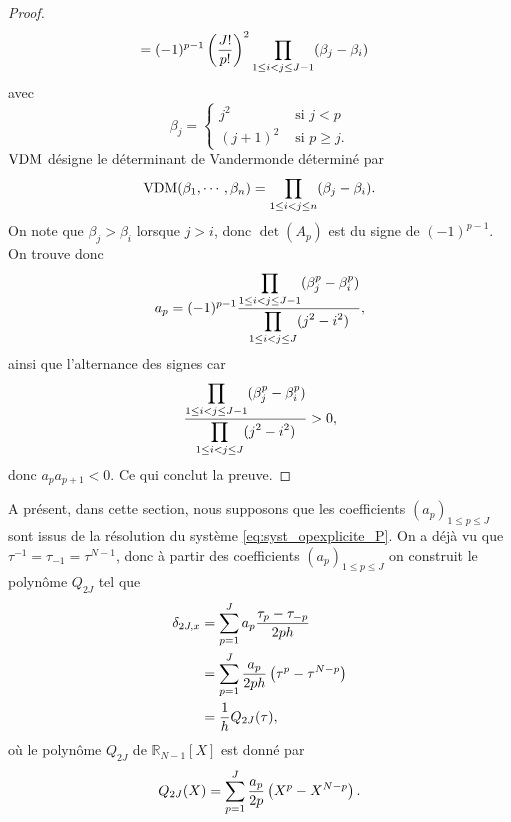 \begin{proof}
\begin{align*}
	& = (-1)^{p-1} \left( \dfrac{J!}{p!} \right)^2 \displaystyle\prod\limits_{1 \leq i <j \leq J-1}(\beta_j - \beta_i)
\end{align*}
avec
\begin{equation}
\beta_j = \left\lbrace
\begin{array}{cl}
j^2 & \text{ si } j < p \\
(j+1)^2 & \text{ si } p \geq j.
\end{array}
\right.
\end{equation}
$\text{VDM}$ désigne le déterminant de Vandermonde \cite{Evans1976} déterminé par 
\begin{equation}
\text{VDM}(\beta_1, \cdots, \beta_n) = \displaystyle\prod\limits_{1\leq i < j \leq n} (\beta_j - \beta_i).
\end{equation}
On note que $\beta_j > \beta_i$ lorsque $j>i$, donc $\det (A_p)$ est du signe de $(-1)^{p-1}$.
On trouve donc 
\begin{equation}
a_p = (-1)^{p-1} \dfrac{\displaystyle\prod\limits_{1 \leq i <j \leq J-1}(\beta_j^p - \beta_i^p)}{\displaystyle\prod\limits_{1 \leq i <j \leq J}(j^2 - i^2)},
\end{equation}
ainsi que l'alternance des signes car
\begin{equation}
\dfrac{\displaystyle\prod\limits_{1 \leq i <j \leq J-1}(\beta_j^p - \beta_i^p)}{\displaystyle\prod\limits_{1 \leq i <j \leq J}(j^2 - i^2)} > 0,
\end{equation}
donc $a_p a_{p+1} < 0$. Ce qui conclut la preuve.
\end{proof}
A présent, dans cette section, nous supposons que les coefficients $(a_p)_{1 \leq p \leq J}$ sont issus de la résolution du système \eqref{eq:syst_opexplicite_P}. On a déjà vu que $\tau^{-1} = \tau_{-1} = \tau^{N-1}$, donc à partir des coefficients $(a_p)_{1 \leq p \leq J}$ on construit le polynôme $Q_{2J}$ tel que
\begin{align*}
\delta_{2J,x} & = \displaystyle\sum\limits_{p=1}^J a_p \dfrac{\tau_p - \tau_{-p}}{2ph}\\
	& = \displaystyle\sum\limits_{p=1}^J \dfrac{a_p}{2ph} \left( \tau^p - \tau^{N-p} \right)\\
	& = \dfrac{1}{h} Q_{2J}(\tau),
\end{align*}
où le polynôme $Q_{2J}$ de $\mathbb{R}_{N-1}[X]$ est donné par
\begin{equation}
Q_{2J}(X) = \displaystyle\sum\limits_{p=1}^J \dfrac{a_p}{2p} \left( X^p - X^{N-p} \right).
\end{equation}

